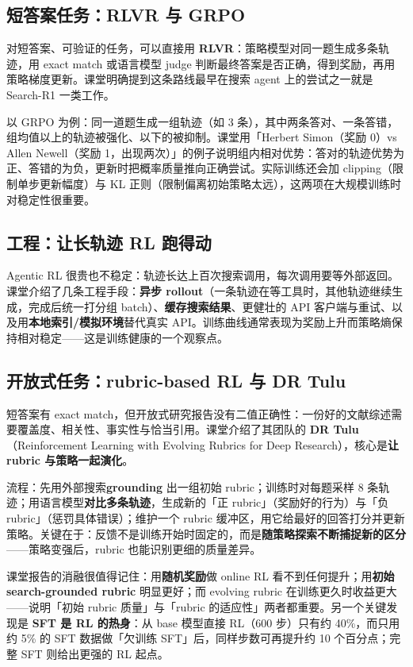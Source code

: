 \documentclass[a4paper]{article}
\begin{document}
\subsection{短答案任务：RLVR 与 GRPO}

对短答案、可验证的任务，可以直接用 \textbf{RLVR}：策略模型对同一题生成多条轨迹，用 exact match 或语言模型 judge 判断最终答案是否正确，得到奖励，再用策略梯度更新。课堂明确提到这条路线最早在搜索 agent 上的尝试之一就是 Search-R1 一类工作。

以 GRPO 为例：同一道题生成一组轨迹（如 3 条），其中两条答对、一条答错，组均值以上的轨迹被强化、以下的被抑制。课堂用「Herbert Simon（奖励 0）vs Allen Newell（奖励 1，出现两次）」的例子说明组内相对优势：答对的轨迹优势为正、答错的为负，更新时把概率质量推向正确尝试。实际训练还会加 clipping（限制单步更新幅度）与 KL 正则（限制偏离初始策略太远），这两项在大规模训练时对稳定性很重要。

\subsection{工程：让长轨迹 RL 跑得动}

Agentic RL 很贵也不稳定：轨迹长达上百次搜索调用，每次调用要等外部返回。课堂介绍了几条工程手段：\textbf{异步 rollout}（一条轨迹在等工具时，其他轨迹继续生成，完成后统一打分组 batch）、\textbf{缓存搜索结果}、更健壮的 API 客户端与重试、以及用\textbf{本地索引/模拟环境}替代真实 API。训练曲线通常表现为奖励上升而策略熵保持相对稳定——这是训练健康的一个观察点。

\subsection{开放式任务：rubric-based RL 与 DR Tulu}

短答案有 exact match，但开放式研究报告没有二值正确性：一份好的文献综述需要覆盖度、相关性、事实性与恰当引用。课堂介绍了其团队的 \textbf{DR Tulu}（Reinforcement Learning with Evolving Rubrics for Deep Research），核心是\textbf{让 rubric 与策略一起演化}。

流程：先用外部搜索\textbf{grounding} 出一组初始 rubric；训练时对每题采样 8 条轨迹；用语言模型\textbf{对比多条轨迹}，生成新的「正 rubric」（奖励好的行为）与「负 rubric」（惩罚具体错误）；维护一个 rubric 缓冲区，用它给最好的回答打分并更新策略。关键在于：反馈不是训练开始时固定的，而是\textbf{随策略探索不断捕捉新的区分}——策略变强后，rubric 也能识别更细的质量差异。

课堂报告的消融很值得记住：用\textbf{随机奖励}做 online RL 看不到任何提升；用\textbf{初始 search-grounded rubric} 明显更好；而 evolving rubric 在训练更久时收益更大——说明「初始 rubric 质量」与「rubric 的适应性」两者都重要。另一个关键发现是 \textbf{SFT 是 RL 的热身}：从 base 模型直接 RL（600 步）只有约 40\%，而只用约 5\% 的 SFT 数据做「欠训练 SFT」后，同样步数可再提升约 10 个百分点；完整 SFT 则给出更强的 RL 起点。
\end{document}
